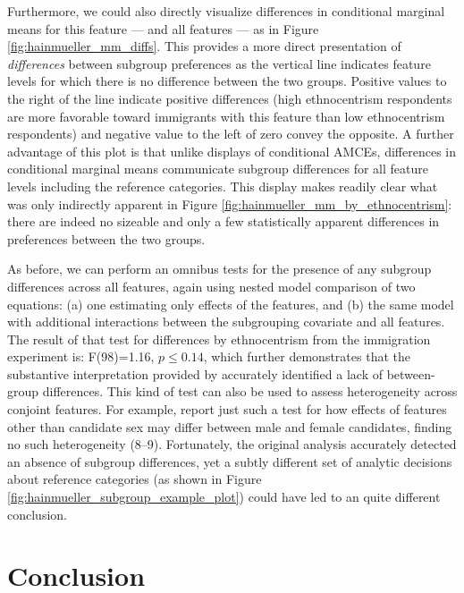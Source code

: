 \documentclass[a4paper,12pt]{article}\usepackage[]{graphicx}\usepackage[]{color}
\begin{document}
Furthermore, we could also directly visualize differences in conditional marginal means for this feature --- and all features --- as in Figure \ref{fig:hainmueller_mm_diffs}. This provides a more direct presentation of \textit{differences} between subgroup preferences as the vertical line indicates feature levels for which there is no difference between the two groups. Positive values to the right of the line indicate positive differences (high ethnocentrism respondents are more favorable toward immigrants with this feature than low ethnocentrism respondents) and negative value to the left of zero convey the opposite. A further advantage of this plot is that unlike displays of conditional AMCEs, differences in conditional marginal means communicate subgroup differences for all feature levels including the reference categories. This display makes readily clear what was only indirectly apparent in Figure \ref{fig:hainmueller_mm_by_ethnocentrism}: there are indeed no sizeable and only a few statistically apparent differences in preferences between the two groups.



As before, we can perform an omnibus tests for the presence of any subgroup differences across all features, again using nested model comparison of two equations: (a) one estimating only effects of the features, and (b) the same model with additional interactions between the subgrouping covariate and all features. The result of that test for differences by ethnocentrism from the immigration experiment is: F(98)=1.16, $p\leq0.14$, which further demonstrates that the substantive interpretation provided by \citet{HainmuellerHopkinsYamamoto2014} accurately identified a lack of between-group differences. This kind of test can also be used to assess heterogeneity across conjoint features. For example, \citet{TeeleKallaRosenbluth2018} report just such a test for how effects of features other than candidate sex may differ between male and female candidates, finding no such heterogeneity (8--9). Fortunately, the original analysis accurately detected an absence of subgroup differences, yet a subtly different set of analytic decisions about reference categories (as shown in Figure \ref{fig:hainmueller_subgroup_example_plot}) could have led to an quite different conclusion.

\section*{Conclusion}\label{sec:conclusion}
\end{document}
